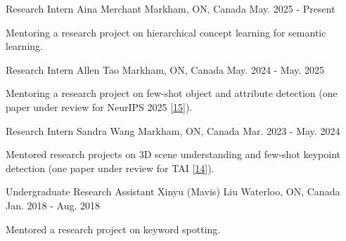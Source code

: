 \begin{cventries}
\cventry
{Research Intern} %
{Aina Merchant} %
{Markham, ON, Canada} %
{May. 2025 - Present} %
{ %
\begin{cvitems}
\item {Mentoring a research project on hierarchical concept learning for semantic learning.}
\end{cvitems}
}
\cventry
{Research Intern} %
{Allen Tao} %
{Markham, ON, Canada} %
{May. 2024 - May. 2025} %
{ %
\begin{cvitems}
\item {Mentoring a research project on few-shot object and attribute detection  (one paper under review for NeurIPS 2025 [\hyperlink{TIDES:NeurIPS}{15}]).}
\end{cvitems}
}
\cventry
{Research Intern} %
{Sandra Wang} %
{Markham, ON, Canada} %
{Mar. 2023 - May. 2024} %
{ %
\begin{cvitems}
\item {Mentored research projects on 3D scene understanding and few-shot keypoint detection (one paper under review for TAI [\hyperlink{LAM:TAI}{14}]).}
\end{cvitems}
}
\cventry
{Undergraduate Research Assistant} %
{Xinyu (Mavis) Liu} %
{Waterloo, ON, Canada} %
{Jan. 2018 - Aug. 2018} %
{ %
\begin{cvitems}
\item {Mentored a research project on keyword spotting.}
\end{cvitems}
}
\end{cventries}
